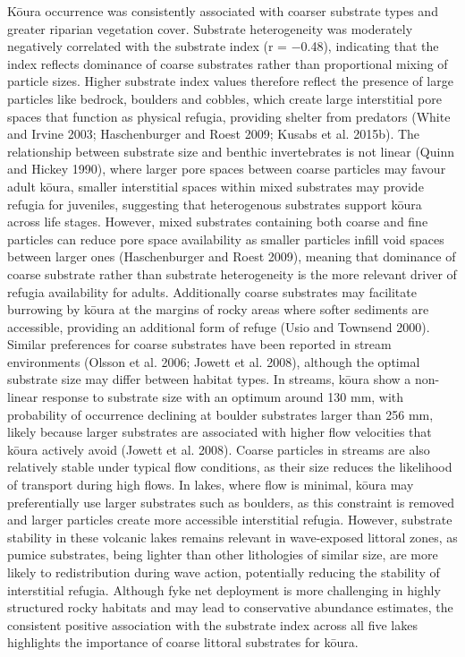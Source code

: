 \documentclass[
  12pt,
  a4paper,
  oneside]{scrbook}
\begin{document}
Kōura occurrence was consistently associated with coarser substrate
types and greater riparian vegetation cover. Substrate heterogeneity was
moderately negatively correlated with the substrate index (r = −0.48),
indicating that the index reflects dominance of coarse substrates rather
than proportional mixing of particle sizes. Higher substrate index
values therefore reflect the presence of large particles like bedrock,
boulders and cobbles, which create large interstitial pore spaces that
function as physical refugia, providing shelter from predators (White
and Irvine 2003; Haschenburger and Roest 2009; Kusabs et al. 2015b). The
relationship between substrate size and benthic invertebrates is not
linear (Quinn and Hickey 1990), where larger pore spaces between coarse
particles may favour adult kōura, smaller interstitial spaces within
mixed substrates may provide refugia for juveniles, suggesting that
heterogenous substrates support kōura across life stages. However, mixed
substrates containing both coarse and fine particles can reduce pore
space availability as smaller particles infill void spaces between
larger ones (Haschenburger and Roest 2009), meaning that dominance of
coarse substrate rather than substrate heterogeneity is the more
relevant driver of refugia availability for adults. Additionally coarse
substrates may facilitate burrowing by kōura at the margins of rocky
areas where softer sediments are accessible, providing an additional
form of refuge (Usio and Townsend 2000). Similar preferences for coarse
substrates have been reported in stream environments (Olsson et al.
2006; Jowett et al. 2008), although the optimal substrate size may
differ between habitat types. In streams, kōura show a non-linear
response to substrate size with an optimum around 130 mm, with
probability of occurrence declining at boulder substrates larger than
256 mm, likely because larger substrates are associated with higher flow
velocities that kōura actively avoid (Jowett et al. 2008). Coarse
particles in streams are also relatively stable under typical flow
conditions, as their size reduces the likelihood of transport during
high flows. In lakes, where flow is minimal, kōura may preferentially
use larger substrates such as boulders, as this constraint is removed
and larger particles create more accessible interstitial refugia.
However, substrate stability in these volcanic lakes remains relevant in
wave-exposed littoral zones, as pumice substrates, being lighter than
other lithologies of similar size, are more likely to redistribution
during wave action, potentially reducing the stability of interstitial
refugia. Although fyke net deployment is more challenging in highly
structured rocky habitats and may lead to conservative abundance
estimates, the consistent positive association with the substrate index
across all five lakes highlights the importance of coarse littoral
substrates for kōura.
\end{document}
